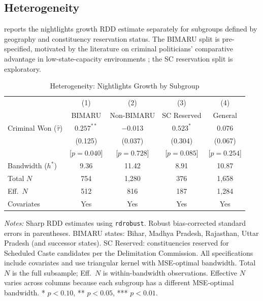 \documentclass[12pt]{article}
\begin{document}
\subsection{Heterogeneity}

 reports the nightlights growth RDD estimate separately for subgroups defined by geography and constituency reservation status. The BIMARU split is pre-specified, motivated by the literature on criminal politicians' comparative advantage in low-state-capacity environments \citep{vaishnav2017}; the SC reservation split is exploratory.

\begin{table}[H]
\centering
\caption{Heterogeneity: Nightlights Growth by Subgroup}
\label{tab:heterogeneity}
\begin{threeparttable}
\begin{tabular}{lcccc}
\toprule
 & (1) & (2) & (3) & (4) \\
 & BIMARU & Non-BIMARU & SC Reserved & General \\
\midrule
Criminal Won ($\hat{\tau}$) & $0.257^{**}$ & $-$0.013 & $0.523^{*}$ & 0.076 \\
 & (0.125) & (0.037) & (0.304) & (0.067) \\
 & [$p=0.040$] & [$p=0.728$] & [$p=0.085$] & [$p=0.254$] \\[6pt]
Bandwidth ($h^*$) & 9.36 & 11.42 & 8.91 & 10.87 \\
Total $N$ & 754 & 1,280 & 376 & 1,658 \\
Eff.\ $N$ & 512 & 816 & 187 & 1,284 \\
Covariates & Yes & Yes & Yes & Yes \\
\bottomrule
\end{tabular}
\begin{tablenotes}[flushleft]
\small
\item \textit{Notes:} Sharp RDD estimates using \texttt{rdrobust}. Robust bias-corrected standard errors in parentheses. BIMARU states: Bihar, Madhya Pradesh, Rajasthan, Uttar Pradesh (and successor states). SC Reserved: constituencies reserved for Scheduled Caste candidates per the Delimitation Commission. All specifications include covariates and use triangular kernel with MSE-optimal bandwidth. Total $N$ is the full subsample; Eff.\ $N$ is within-bandwidth observations. Effective $N$ varies across columns because each subgroup has a different MSE-optimal bandwidth. * $p<0.10$, ** $p<0.05$, *** $p<0.01$.
\end{tablenotes}
\end{threeparttable}
\end{table}
\end{document}
